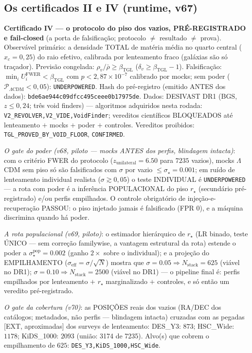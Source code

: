 \documentclass[11pt]{article}
\newcommand{\bTGL}{\beta_{\mathrm{TGL}}}\newcommand{\Msun}{M_{\odot}}\newcommand{\TGL}{\mathrm{TGL}}
\theoremstyle{definition}\newtheorem{deriv}{Derivação}
\begin{document}
\subsection*{Os certificados II e IV (runtime, v67)}

\textbf{Certificado IV --- o protocolo do piso dos vazios, PRÉ-REGISTRADO e fail-closed} (a porta de falsificação; protocolo $\neq$ resultado $\neq$ prova). Observável primário: a densidade TOTAL de matéria média no quarto central ($x_c=0{,}25$) do raio efetivo, calibrada por lenteamento fraco (galáxias são só traçador). Previsão congelada: $\rho_v/\bar\rho\ge\bTGL$ ($\delta_v\ge\bTGL-1$). Falsificação: $\min_i U_i^{\mathrm{FWER}}<\bTGL$ com $p<2{,}87\times10^{-7}$ calibrado por mocks; sem poder ($\mathcal P_{\Lambda\mathrm{CDM}}<0{,}05$): \texttt{UNDERPOWERED}. Hash do pré-registro (emitido ANTES dos dados): \texttt{bde6ae944c09dfcc495ceee0b17975de}. Dados: DESIVAST DR1 (BGS, $z\le0{,}24$; três void finders) --- algoritmos adquiridos nesta rodada: \texttt{V2\_REVOLVER,V2\_VIDE,VoidFinder}; vereditos científicos BLOQUEADOS até lenteamento $+$ mocks $+$ poder $+$ controles. Vereditos proibidos: \texttt{TGL\_PROVED\_BY\_VOID\_FLOOR}, \texttt{CONFIRMED}.

\emph{O gate do poder (v68, piloto --- mocks ANTES dos perfis, blindagem intacta)}: com o critério FWER do protocolo ($z_{\mathrm{unilateral}}=6.50$ para $7235$ vazios), mocks $\Lambda$CDM sem piso só são falsificados com $\sigma$ por vazio $\le\sigma_\star=0.001$; em ruído de lenteamento individual realista ($\sigma\gtrsim0{,}05$) o teste INDIVIDUAL é \texttt{UNDERPOWERED} --- a rota com poder é a inferência POPULACIONAL do piso $r_\star$ (secundário pré-registrado) e/ou perfis empilhados. O controle obrigatório de injeção-e-recuperação PASSOU: o piso injetado jamais é falsificado (FPR $0$), e a máquina discrimina quando há poder.

\emph{A rota populacional (v69, piloto)}: o estimador hierárquico de $r_\star$ (LR binado, teste ÚNICO --- sem correção familywise, a vantagem estrutural da rota) estende o poder a $\sigma^{\mathrm{pop}}_\star=0.002$ (ganho $2\times$ sobre o individual); e a projeção do EMPILHAMENTO ($\sigma_{\mathrm{eff}}=\sigma/\sqrt{N}$) mostra que $\sigma=0.05\Rightarrow N_{\mathrm{stack}}=625$ (viável no DR1); $\sigma=0.10\Rightarrow N_{\mathrm{stack}}=2500$ (viável no DR1) --- o pipeline final é: perfis empilhados por lenteamento $+$ $r_\star$ marginalizado $+$ controles, e só então um veredito pré-registrado.

\emph{O gate da cobertura (v70)}: as POSIÇÕES reais dos vazios (RA/DEC dos catálogos; metadados, não perfis --- blindagem intacta) cruzadas com as pegadas [EXT, aproximadas] dos surveys de lenteamento: DES\_Y3: $873$; HSC\_Wide: $1178$; KiDS\_1000: $2093$ (união: 3174 de 7235). Alvo(s) que cobrem o empilhamento de $625$: \texttt{DES\_Y3,KiDS\_1000,HSC\_Wide}.
\end{document}
